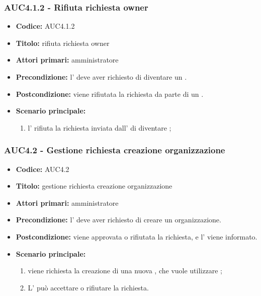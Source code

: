 \documentclass[casi-duso]{subfiles}
\begin{document}
\subsubsection{AUC4.1.2 - Rifiuta richiesta owner}
\label{subsub:AUC4.1.2}
\begin{itemize}
  \item \textbf{Codice:} AUC4.1.2
  \item \textbf{Titolo:} rifiuta richiesta owner
  \item \textbf{Attori primari:} amministratore
  \item \textbf{Precondizione:} l' deve aver richiesto di diventare un .
  \item \textbf{Postcondizione:} viene rifiutata la richiesta da parte di un .
  \item \textbf{Scenario principale:} 
  \begin{enumerate}
    \item l' rifiuta la richiesta inviata dall' di diventare ;
  \end{enumerate}
\end{itemize}

\subsubsection{AUC4.2 - Gestione richiesta creazione organizzazione}
\label{subsub:AUC4.2}
\begin{itemize}
  \item \textbf{Codice:} AUC4.2
  \item \textbf{Titolo:} gestione richiesta creazione organizzazione
  \item \textbf{Attori primari:} amministratore
  \item \textbf{Precondizione:} l' deve aver richiesto di creare un organizzazione.
  \item \textbf{Postcondizione:} viene approvata o rifiutata la richiesta, e l' viene informato.
  \item \textbf{Scenario principale:} 
  \begin{enumerate}
    \item viene richiesta la creazione di una nuova , che vuole utilizzare ;
    \item L' può accettare o rifiutare la richiesta.
  \end{enumerate}
\end{itemize}
\end{document}
